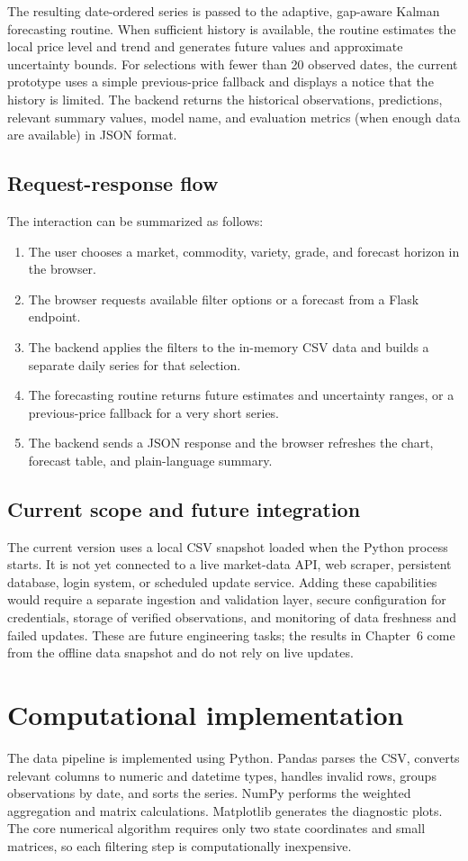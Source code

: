 \documentclass[12pt,a4paper,oneside]{report}
\numberwithin{equation}{chapter}
\numberwithin{figure}{chapter}
\numberwithin{table}{chapter}
\theoremstyle{definition}
\theoremstyle{plain}
\newcommand{\1}{\mathbf{1}}
\begin{document}
The resulting date-ordered series is passed to the adaptive, gap-aware Kalman forecasting routine. When sufficient history is available, the routine estimates the local price level and trend and generates future values and approximate uncertainty bounds. For selections with fewer than 20 observed dates, the current prototype uses a simple previous-price fallback and displays a notice that the history is limited. The backend returns the historical observations, predictions, relevant summary values, model name, and evaluation metrics (when enough data are available) in JSON format.

\subsection{Request-response flow}
The interaction can be summarized as follows:
\begin{enumerate}
  \item The user chooses a market, commodity, variety, grade, and forecast horizon in the browser.
  \item The browser requests available filter options or a forecast from a Flask endpoint.
  \item The backend applies the filters to the in-memory CSV data and builds a separate daily series for that selection.
  \item The forecasting routine returns future estimates and uncertainty ranges, or a previous-price fallback for a very short series.
  \item The backend sends a JSON response and the browser refreshes the chart, forecast table, and plain-language summary.
\end{enumerate}

\subsection{Current scope and future integration}
The current version uses a local CSV snapshot loaded when the Python process starts. It is not yet connected to a live market-data API, web scraper, persistent database, login system, or scheduled update service. Adding these capabilities would require a separate ingestion and validation layer, secure configuration for credentials, storage of verified observations, and monitoring of data freshness and failed updates. These are future engineering tasks; the results in Chapter~6 come from the offline data snapshot and do not rely on live updates.

\section{Computational implementation}
The data pipeline is implemented using Python. Pandas parses the CSV, converts relevant columns to numeric and datetime types, handles invalid rows, groups observations by date, and sorts the series. NumPy performs the weighted aggregation and matrix calculations. Matplotlib generates the diagnostic plots. The core numerical algorithm requires only two state coordinates and small matrices, so each filtering step is computationally inexpensive.
\end{document}
